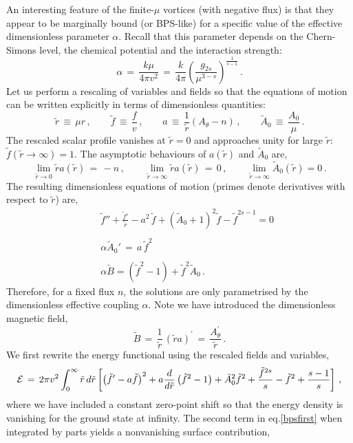 \documentclass[12pt,a4paper]{article}
\def\be{\begin{equation}}
\def\ee{\end{equation}}
\newcommand{\bea}{\begin{eqnarray}}
\newcommand{\eea}{\end{eqnarray}}
\begin{document}
An interesting feature of the finite-$\mu$ vortices (with negative flux)  is that they appear to be  marginally bound (or BPS-like) for a specific value of the effective dimensionless parameter $\alpha$. Recall that this parameter depends on the Chern-Simons level, the chemical potential and the interaction strength:
\be
\alpha \,=\,\frac{k\mu}{4\pi v^2}\,=\,\frac{k}{4\pi}\left(\frac{g_{2s}}{\mu^{3-s}}\right)^{\frac1{s-1}}\,.\label{alphadef}
\ee
Let us perform a rescaling of variables and fields so that the equations of motion can be written explicitly in terms of dimensionless quantities:
\be
\tilde r\,\equiv\,\mu r\,,\qquad \tilde f\,\equiv\, \frac{f}{v}\,,\qquad a\,\equiv\,\frac{1}{\tilde r} \left(A_\theta-n\right)\,,\qquad \tilde A_0\,\equiv\,\frac{A_0}{\mu}\,.
\ee
The rescaled scalar profile vanishes at  $\tilde r=0$ and approaches unity for large $\tilde r$: $\tilde f(\tilde r\to\infty)=1$.  The asymptotic behaviours of $a(\tilde r)$ and $\tilde A_0$ are,
\be
\lim_{\tilde r\to 0}\tilde r a(\tilde r)\,=\,-n\,,\qquad \lim_{\tilde r\to \infty}\tilde r a(\tilde r)\,=\,0\,,\qquad \lim_{\tilde r\to \infty}\tilde A_0(\tilde r)=0\,.
\ee
The resulting dimensionless equations of motion (primes denote derivatives with respect to $\tilde r$) are,
 \bea
 &&\tilde f'' + \frac{\tilde f'}{\tilde r} - a^2\, \tilde{f} + \left(\tilde A_0+1\right)^2\tilde{f}  -\tilde f^{2s-1} =0 \label{eq:dimlesseom1}\\\nonumber\\
&& \alpha \tilde A_0' \,=\,  a\,\tilde f^2 \label{eq:dimlesseom2}\\\nonumber\\
  &&      \alpha \tilde B= \left(\tilde f^2-1\right)+\tilde f^2 \tilde A_0\,.\label{eq:dimlesseom3}
 \eea
Therefore, for a fixed flux $n$, the solutions are only parametrised by the  dimensionless 
effective coupling $\alpha$. Note we have introduced the
dimensionless magnetic field,
\be
\tilde B\,=\,\frac{1}{\tilde r}\,\left(\tilde r a\right)^\prime\,=\,\frac{A_\theta^\prime}{\tilde r}\,.
\ee
We first rewrite the energy functional using the rescaled fields and variables,
\be
{\cal E}\,=\,2\pi v^2\int_0^\infty \tilde r\, d\tilde r\left[\left(\tilde f'- a \tilde f\right)^2 + a\frac{d }{d\tilde r}\left(\tilde f^2-1\right)+\tilde A_0^2\tilde f^2 +\frac{\tilde f^{2s}}{s}-\tilde f^2 +\frac{s-1}{s}
\right]\,,\label{bpsfirst}
\ee
where we have included a constant zero-point shift so that the energy density is vanishing for the ground state at infinity. The second term in eq.\eqref{bpsfirst} when integrated by parts yields a nonvanishing surface contribution,
\end{document}
